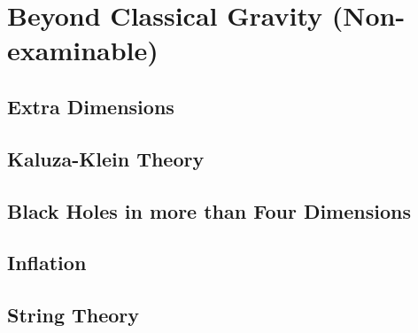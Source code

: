 \setchapterpreamble[u]{\margintoc}
\chapter{Beyond Classical Gravity (Non-examinable)}

\section{Extra Dimensions}
\section{Kaluza-Klein Theory}
\section{Black Holes in more than Four Dimensions}
\section{Inflation}
\section{String Theory}